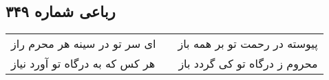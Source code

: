 \begin{center}
\section*{رباعی شماره ۳۴۹}
\label{sec:sh349}
\begin{longtable}{l p{0.5cm} r}
ای سر تو در سینه هر محرم راز
&&
پیوسته در رحمت تو بر همه باز
\\
هر کس که به درگاه تو آورد نیاز
&&
محروم ز درگاه تو کی گردد باز
\\
\end{longtable}
\end{center}
